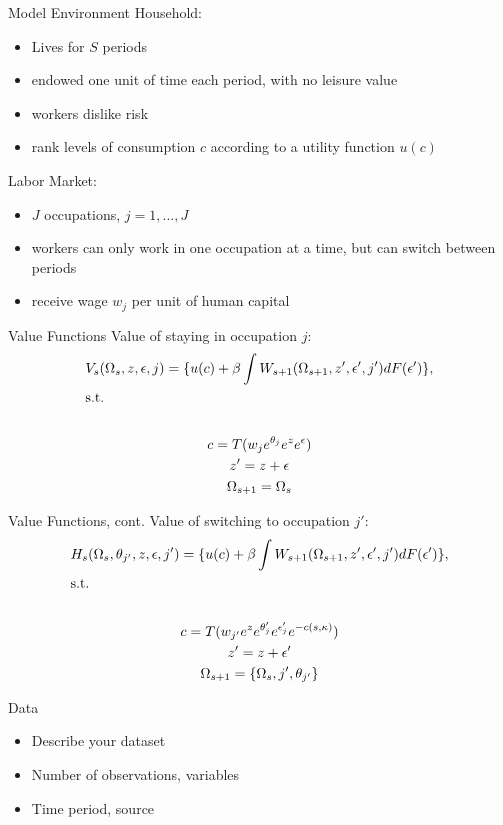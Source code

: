 \documentclass{beamer}
\begin{document}
\begin{frame}{Model Environment}
  Household:
  \begin{itemize}
    \item Lives for $S$ periods
    \item endowed one unit of time each period, with no leisure value
    \item workers dislike risk
    \item rank levels of consumption $c$ according to a utility function $u(c)$
  \end{itemize}
  \pause
  Labor Market:
  \begin{itemize}
    \item $J$ occupations, $j=1,...,J$
    \item workers can only work in one occupation at a time, but can switch between periods
    \item receive wage $w_j$ per unit of human capital
  \end{itemize}
\end{frame}
\begin{frame}{Value Functions}
  Value of staying in occupation $j$:
  \begin{gather*}
    V_s(\Omega_s, z, \epsilon, j) = \{u(c) + \beta\int W_{s+1}(\Omega_{s+1}, z', \epsilon', j')dF(\epsilon')\}, \\
    \shortintertext{s.t.} \\
    c = T(w_je^{\theta_j}e^ze^{\epsilon}) \\
    z' = z + \epsilon \\
    \Omega_{s+1} = \Omega_s
  \end{gather*}
\end{frame}
\begin{frame}{Value Functions, cont.}
  Value of switching to occupation $j'$:
  \begin{gather*}
    H_s(\Omega_s, \theta_{j'}, z, \epsilon, j') = \{u(c) + \beta\int W_{s+1}(\Omega_{s+1}, z', \epsilon', j')dF(\epsilon')\}, \\
    \shortintertext{s.t.} \\
    c = T(w_{j'}e^ze^{\theta_j'}e^{\epsilon_j'}e^{-c(s,\kappa)}) \\
    z' = z+ \epsilon' \\
    \Omega_{s+1} = \{\Omega_s, j', \theta_{j'}\}
  \end{gather*}
\end{frame}

\begin{frame}{Data}
  \begin{itemize}
    \item Describe your dataset
    \item Number of observations, variables
    \item Time period, source
  \end{itemize}
\end{frame}
\end{document}
